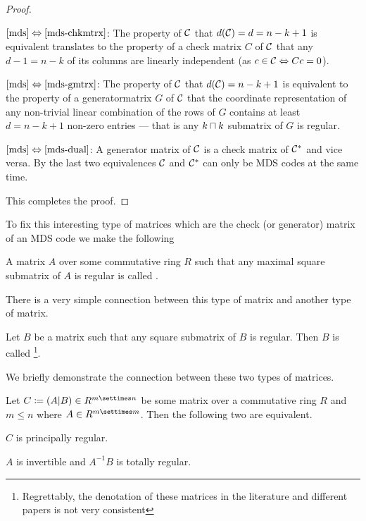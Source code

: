 \begin{proof}
    \begin{implications}
            \item[$\autoref{mds}\equival\autoref{mds-chkmtrx}$:]
        The property of $\mathcal{C}$ that $d(\mathcal{C})=d=n-k+1$ is equivalent translates to the property of a check matrix $C$ of $\mathcal{C}$ that any $d-1=n-k$ of its columns are linearly independent (as $c\in\mathcal{C}\Leftrightarrow Cc=0$).
            \item[$\autoref{mds}\equival\autoref{mds-gmtrx}$:]
        The property of $\mathcal{C}$ that $d(\mathcal{C})=n-k+1$ is equivalent to the property of a generatormatrix $G$ of $\mathcal{C}$ that the coordinate representation of any non-trivial linear combination of the rows of $G$ contains at least $d=n-k+1$ non-zero entries --- that is any $k\setprod k$ submatrix of $G$ is regular.
            \item[$\autoref{mds}\equival\autoref{mds-dual}$:]
        A generator matrix of $\mathcal{C}$ is a check matrix of $\mathcal{C}^{\ast}$ and vice versa. By the last two equivalences $\mathcal{C}$ and $\mathcal{C}^{\ast}$ can only be MDS codes at the same time. 
    \end{implications}
This completes the proof.
\end{proof}

To fix this interesting type of matrices which are the check (or generator) matrix of an MDS code we make the following

\begin{definition}
    A matrix $A$ over some commutative ring $R$ such that any maximal square submatrix of $A$ is regular is called .
\end{definition}

There is a very simple connection between this type of matrix and another type of matrix.

\begin{definition}
    Let $B$ be a matrix such that any square submatrix of $B$ is regular. Then $B$ is called \footnote{Regrettably, the denotation of these matrices in the literature and different papers is not very consistent}. 
\end{definition}

We briefly demonstrate the connection between these two types of matrices.

\begin{lemma}
    Let $C\defeq(A|B)\in R^{m\settimes n}$ be some matrix over a commutative ring $R$ and $m\leq n$ where $A\in R^{m\settimes m}$.
    Then the following two are equivalent.
    \begin{statements}
            \item $C$ is principally regular.
            \item $A$ is invertible and $A^{-1}B$ is totally regular.
    \end{statements}
\end{lemma}

